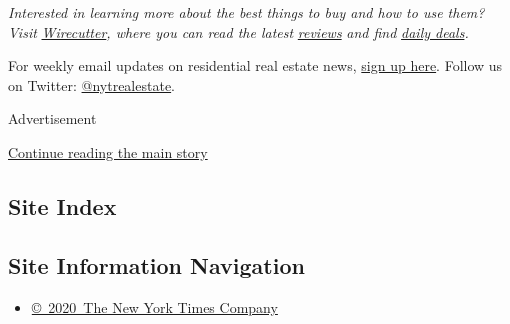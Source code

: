 \emph{Interested in learning more about the best things to buy and how
to use them? Visit}
\href{https://www.nytimes.com/wirecutter/?utm_source=nytimes\&utm_medium=referral\&utm_campaign=wcrealestate\&utm_content=outdoor-space}{\emph{Wirecutter}}\emph{,
where you can read the latest}
\href{https://www.nytimes.com/wirecutter/reviews?utm_source=nytimes\&utm_medium=referral\&utm_campaign=wcrealestate\&utm_content=outdoor-space}{\emph{reviews}}
\emph{and find}
\href{https://www.nytimes.com/wirecutter/deals/?utm_source=nytimes\&utm_medium=referral\&utm_campaign=wcrealestate\&utm_content=outdoor-space}{\emph{daily
deals}}\emph{.}

For weekly email updates on residential real estate news,
\href{http://www.nytimes.com/newsletters/realestate/}{sign up here}.
Follow us on Twitter:
\href{https://twitter.com/nytrealestate}{@nytrealestate}.

Advertisement

\protect\hyperlink{after-bottom}{Continue reading the main story}

\hypertarget{site-index}{%
\subsection{Site Index}\label{site-index}}

\hypertarget{site-information-navigation}{%
\subsection{Site Information
Navigation}\label{site-information-navigation}}

\begin{itemize}
\tightlist
\item
  \href{https://help.nytimes.com/hc/en-us/articles/115014792127-Copyright-notice}{©~2020~The
  New York Times Company}
\end{itemize}

